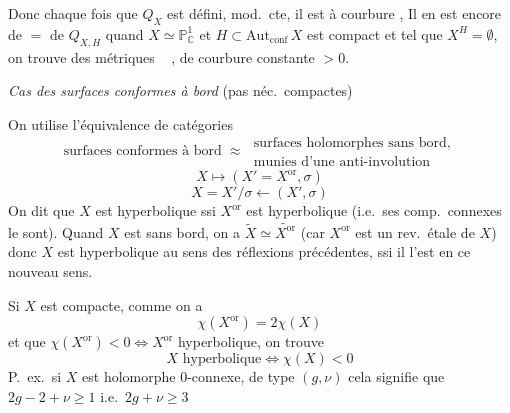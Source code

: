 \documentclass[11pt,a4paper]{article}
\begin{document}
Donc chaque fois que $Q_{X}$ est défini,  
mod.\ cte, il est à courbure , \struck{\ill{}} Il en est
encore de $=$ de $Q_{X,H}$ quand $X \simeq \mathbb{P}^{1}_{\mathbb{C}}$ et
$H \subset \mathrm{Aut}_{\mathrm{conf}}\, X$ est compact et tel que
$X^{H} = \emptyset$, on trouve \struck{\ill{}} des métriques
\   \ill{}, de
courbure constante $> 0$.


\emph{Cas des surfaces conformes à bord} (pas néc.\ compactes)

On utilise l'équivalence de catégories
\[
  \text{surfaces conformes à bord} \;\approx\;
  \begin{array}{l}
    \text{surfaces holomorphes sans bord,} \\
    \text{munies d'une anti-involution}
  \end{array}
\]
\[
  X \longmapsto (X' = X^{\mathrm{or}}, \sigma)
\]
\[
  X = X'/\sigma \longleftarrow (X', \sigma)
\]
On dit que $X$ est hyperbolique ssi $X^{\mathrm{or}}$ est hyperbolique
(i.e.\ ses comp.\ connexes le sont).
Quand $X$ est sans bord, on a
$\widetilde{X} \simeq \widetilde{X^{\mathrm{or}}}$ (car $X^{\mathrm{or}}$ est
un rev.\ étale de $X$) donc $X$ est hyperbolique au sens des réflexions
précédentes, ssi il l'est en ce nouveau sens.

Si $X$ est compacte, comme on a 
\[
  \chi(X^{\mathrm{or}}) = 2\chi(X)
\]
et que $\chi(X^{\mathrm{or}}) < 0 \iff X^{\mathrm{or}}$ hyperbolique, on
trouve
\[
  X \text{ hyperbolique} \iff \chi(X) < 0
\]
P.\ ex.\ si $X$ est holomorphe 0-connexe, de type $(g, \nu)$ cela signifie
que $2g - 2 + \nu \geq 1$ i.e.\ $2g + \nu \geq 3$
\end{document}

